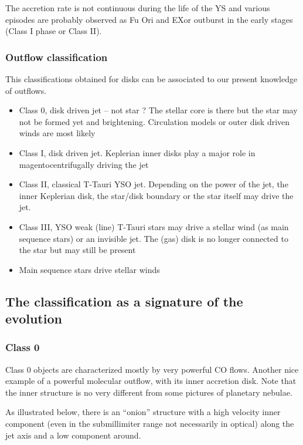 \documentclass[10pt,a4paper,english,draft]{article}
\begin{document}
The accretion rate is not continuous during the life of the YS and various episodes are probably observed as Fu Ori and EXor outburst in the early stages (Class I phase or Class II).


\subsubsection{Outflow classification}

This classifications obtained for disks can be associated to our present knowledge of outflows.
\begin{itemize}
\item Class 0, disk driven jet -- not star ? The stellar core is there but the star may not be formed yet and brightening. Circulation models or outer disk driven winds are most likely
\item Class I, disk driven jet. Keplerian inner disks play a major role in magentocentrifugally driving the jet
\item Class II, classical T-Tauri YSO jet. Depending on the power of the jet, the inner Keplerian disk, the star/disk boundary or the star itself may drive the jet.
\item Class III, YSO weak (line) T-Tauri stars may drive a stellar wind (as main sequence stars) or an invisible jet. The (gas) disk is no longer connected to the star but may still be present
\item Main sequence stars drive stellar winds
\end{itemize}

\subsection{The classification as a signature of the evolution}

\subsubsection{Class 0}

Class 0 objects are characterized mostly by very powerful CO flows. Another nice example of a powerful molecular outflow, with its inner accretion disk. Note that the inner structure is no very different from some pictures of planetary nebulae.


As illustrated below, there is an ``onion'' structure with a high velocity inner component (even in the submillimiter range not necessarily in optical) along the jet axis and a low component around.
\end{document}
